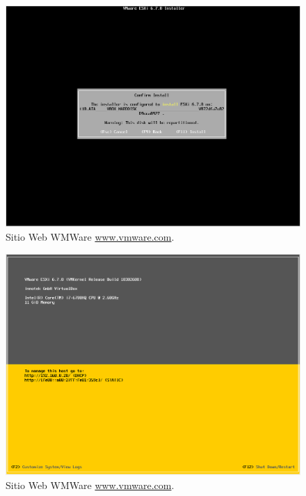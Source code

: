 \begin{figure}[!hbtp]
	\centering
	\includegraphics[width=\linewidth]{RE01_VMwareESXi/RE_VMwareInstalacion13.png}
	\vspace{-0.2cm}
	\caption{Sitio Web WMWare \url{www.vmware.com}.\footnotemark[2]{} }
	\label{fig:VMwareInstalacion13}
\end{figure}


\begin{figure}[!hbtp]
	\centering
	\includegraphics[width=\linewidth]{RE01_VMwareESXi/RE_VMwareInstalacion14.png}
	\vspace{-0.2cm}
	\caption{Sitio Web WMWare \url{www.vmware.com}.\footnotemark[2]{} }
	\label{fig:VMwareInstalacion14}
\end{figure}


